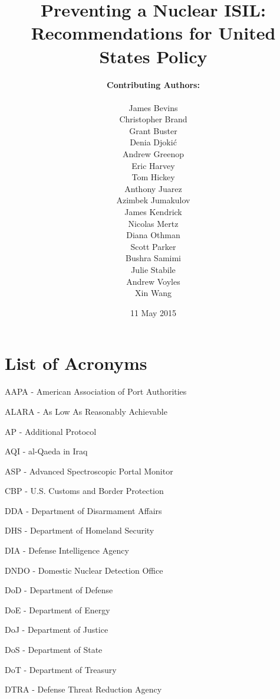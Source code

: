 \documentclass{report}
\title{Preventing a Nuclear ISIL: \\Recommendations for United States Policy}
\date{11 May 2015}
\author{\textbf{Contributing Authors:}\\ \\
James	Bevins\\
Christopher	Brand \\
Grant	Buster\\
Denia	Djoki\'{c}\\
Andrew	Greenop\\
Eric	Harvey\\
Tom	Hickey\\
Anthony	Juarez\\
Azimbek	Jumakulov \\
James	Kendrick\\
Nicolas	Mertz \\
Diana	Othman \\
Scott	Parker \\
Bushra	Samimi \\
Julie	Stabile\\
Andrew	Voyles\\
Xin	Wang
}
\begin{document}
% 
% 
% 
% 
% 


\begin{titlepage}
\maketitle
\thispagestyle{empty}
\end{titlepage}

\pagestyle{fancyTOC}


\tableofcontents
\pagestyle{fancyTOC}




\listoffigures
\thispagestyle{fancyTOC}


\listoftables
\thispagestyle{fancyTOC}

\newpage


\pagestyle{fancyacronym}

\chapter*{List of Acronyms}
\pagestyle{fancyacronym}


AAPA - American Association of Port Authorities

ALARA - As Low As Reasonably Achievable

AP - Additional Protocol

AQI -  al-Qaeda in Iraq

ASP - Advanced Spectroscopic Portal Monitor

CBP - U.S. Customs and Border Protection

DDA - Department of Disarmament Affairs

DHS - Department of Homeland Security

DIA - Defense Intelligence Agency

DNDO - Domestic Nuclear Detection Office

DoD - Department of Defense

DoE - Department of Energy

DoJ - Department of Justice

DoS - Department of State

DoT - Department of Treasury

DTRA - Defense Threat Reduction Agency
\end{document}
